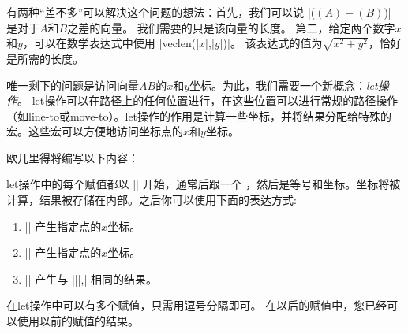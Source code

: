 有两种``差不多''可以解决这个问题的想法：首先，我们可以说 |($ (A) - (B) $)| 是对于$A$和$B$之差的向量。 我们需要的只是该向量的长度。 第二，给定两个数字$x$和$y$，可以在数学表达式中使用 |veclen(|$x$|,|$y$|)|。 该表达式的值为$\sqrt{x^2+y^2}$，恰好是所需的长度。



唯一剩下的问题是访问向量$AB$的$x$和$y$坐标。为此，我们需要一个新概念：\emph{let操作}。 let操作可以在路径上的任何位置进行，在这些位置可以进行常规的路径操作（如line-to或move-to）。let操作的作用是计算一些坐标，并将结果分配给特殊的宏。这些宏可以方便地访问坐标点的$x$和$y$坐标。


欧几里得将编写以下内容：

%
\begin{codeexample}[preamble={\usetikzlibrary{calc}}]
\end{codeexample}


let操作中的每个赋值都以 |\p| 开始，通常后跟一个 ，然后是等号和坐标。坐标将被计算，结果被存储在内部。之后你可以使用下面的表达方式:

%
\begin{enumerate}
    \item |\x| 产生指定点的$x$坐标。
    \item |\y| 产生指定点的$x$坐标。
    \item |\p| 产生与 |\x||,\y| 相同的结果。
\end{enumerate}
%
%
在let操作中可以有多个赋值，只需用逗号分隔即可。 在以后的赋值中，您已经可以使用以前的赋值的结果。

